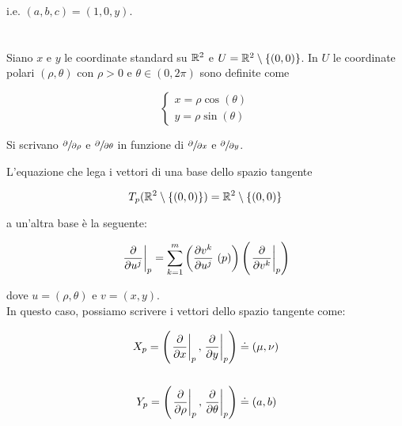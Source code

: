 i.e. $ (a,b,c) = (1,0,y) $.

\tocless\section{}\label{es2-9}

\begin{tcolorbox}
	Siano $ x $ e $ y $ le coordinate standard su $ \mathbb{R}^{2} $ e $ U = \mathbb{R}^{2} \setminus \{(0,0)\} $. In $ U $ le coordinate polari $ (\rho, \theta) $ con $ \rho > 0 $ e $ \theta \in (0,2\pi) $ sono definite come
	
	\begin{equation}
		\begin{cases}
			x = \rho \cos(\theta)\\
			y = \rho \sin(\theta)
		\end{cases}
	\end{equation}
	
	Si scrivano $ \sfrac{\partial}{\partial \rho} $ e $ \sfrac{\partial}{\partial \theta} $ in funzione di $ \sfrac{\partial}{\partial x} $ e $ \sfrac{\partial}{\partial y} $.
\end{tcolorbox}

L'equazione che lega i vettori di una base dello spazio tangente

\begin{equation}
	T_{p}(\mathbb{R}^{2} \setminus \{(0,0)\}) = \mathbb{R}^{2} \setminus \{(0,0)\}
\end{equation}

a un'altra base è la seguente:

\begin{equation}
	\eval{\pdv{u^{j}}}_{p} = \sum_{k=1}^{m} \left( \pdv{v^{k}}{u^{j}}\ (p) \right) \left( \eval{\pdv{v^{k}}}_{p} \right)
\end{equation}

dove $ u = (\rho,\theta) $ e $ v = (x,y) $.\\
In questo caso, possiamo scrivere i vettori dello spazio tangente come:

\begin{align}
	\begin{split}
		X_{p} = \left( \eval{\pdv{x}}_{p}, \eval{\pdv{y}}_{p} \right) &\doteq (\mu,\nu)\\\\
		Y_{p} = \left( \eval{\pdv{\rho}}_{p}, \eval{\pdv{\theta}}_{p} \right) &\doteq (a,b)
	\end{split}
\end{align}

